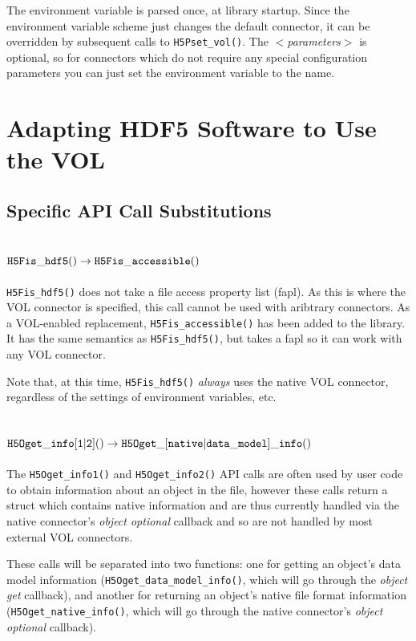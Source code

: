 The environment variable is parsed once, at library startup. Since the environment variable scheme just changes the default connector, it can be overridden by subsequent calls to {\tt H5Pset\_vol()}. The \textit{$<$parameters$>$} is optional, so for connectors which do not require any special configuration parameters you can just set the environment variable to the name.

\section{Adapting HDF5 Software to Use the VOL}

\subsection{Specific API Call Substitutions}
\subsection{${\tt H5Fis\_hdf5()} \rightarrow {\tt H5Fis\_accessible()}$}

{\tt H5Fis\_hdf5()} does not take a file access property list (fapl). As this is where the VOL connector is specified, this call cannot be used with aribtrary connectors. As a VOL-enabled replacement, {\tt H5Fis\_accessible()} has been added to the library. It has the same semantics as {\tt H5Fis\_hdf5()}, but takes a fapl so it can work with any VOL connector.

Note that, at this time, {\tt H5Fis\_hdf5()} \textit{always} uses the native VOL connector, regardless of the settings of environment variables, etc.

\subsection{${\tt H5Oget\_info[1|2]()} \rightarrow {\tt H5Oget\_[native|data\_model]\_info()}$}

\thgfuturewarning

The {\tt H5Oget\_info1()} and {\tt H5Oget\_info2()} API calls are often used by user code to obtain information about an object in the file, however these calls return a struct which contains native information and are thus currently handled via the native connector's \textit{object optional} callback and so are not handled by most external VOL connectors.

These calls will be separated into two functions: one for getting an object's data model information ({\tt H5Oget\_data\_model\_info()}, which will go through the \textit{object get} callback), and another for returning an object's native file format information ({\tt H5Oget\_native\_info()}, which will go through the native connector's \textit{object optional} callback).

